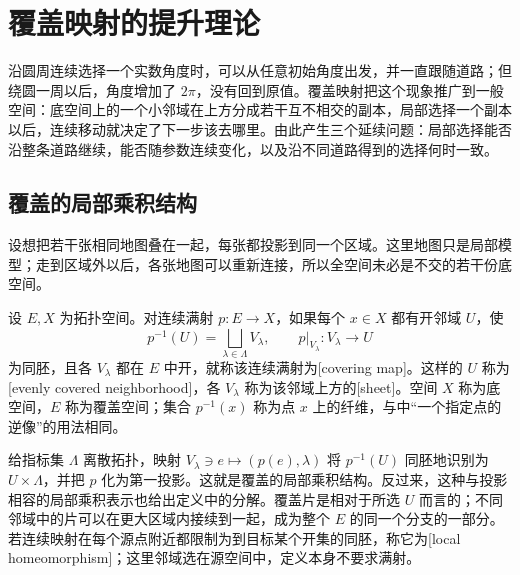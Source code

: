 
% 
% 

\section{覆盖映射的提升理论}
\label{g1:sec:0503}

沿圆周连续选择一个实数角度时，可以从任意初始角度出发，并一直跟随道路；但绕圆一周以后，角度增加了 \(2\pi\)，没有回到原值。覆盖映射把这个现象推广到一般空间：底空间上的一个小邻域在上方分成若干互不相交的副本，局部选择一个副本以后，连续移动就决定了下一步该去哪里。由此产生三个延续问题：局部选择能否沿整条道路继续，能否随参数连续变化，以及沿不同道路得到的选择何时一致。

\subsection{覆盖的局部乘积结构}
\label{g1:subsec:0503:01}

设想把若干张相同地图叠在一起，每张都投影到同一个区域。这里地图只是局部模型；走到区域外以后，各张地图可以重新连接，所以全空间未必是不交的若干份底空间。

\begin{definition}[覆盖映射]\label{g1:def:covering-map}
	设 \(E,X\) 为拓扑空间。对连续满射 \(p:E\to X\)，如果每个 \(x\in X\) 都有开邻域 \(U\)，使
	\[
		p^{-1}(U)=\bigsqcup_{\lambda\in\Lambda}V_\lambda,
		\qquad p|_{V_\lambda}:V_\lambda\longrightarrow U
	\]
	为同胚，且各 \(V_\lambda\) 都在 \(E\) 中开，就称该连续满射为[covering map]。这样的 \(U\) 称为[evenly covered neighborhood]，各 \(V_\lambda\) 称为该邻域上方的[sheet]。空间 \(X\) 称为底空间，\(E\) 称为覆盖空间；集合 \(p^{-1}(x)\) 称为点 \(x\) 上的纤维，与中“一个指定点的逆像”的用法相同。
\end{definition}

给指标集 \(\Lambda\) 离散拓扑，映射 \(V_\lambda\ni e\mapsto(p(e),\lambda)\) 将 \(p^{-1}(U)\) 同胚地识别为 \(U\times\Lambda\)，并把 \(p\) 化为第一投影。这就是覆盖的局部乘积结构。反过来，这种与投影相容的局部乘积表示也给出定义中的分解。覆盖片是相对于所选 \(U\) 而言的；不同邻域中的片可以在更大区域内接续到一起，成为整个 \(E\) 的同一个分支的一部分。若连续映射在每个源点附近都限制为到目标某个开集的同胚，称它为[local homeomorphism]；这里邻域选在源空间中，定义本身不要求满射。


